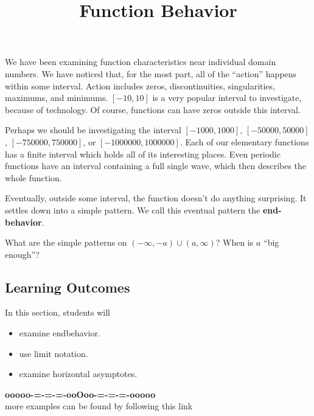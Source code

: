 \documentclass{ximera}
\title{Function Behavior}
\begin{document}
\begin{abstract}
\end{abstract}
\maketitle




We have been examining function characteristics near individual domain numbers. We have noticed that, for the most part, all of the ``action'' happens within some interval.  Action includes zeros, discontinuities, singularities, maximums, and minimums.  $[-10, 10]$  is a very popular interval to investigate, because of technology.  Of course, functions can have zeros outside this interval.  

Perhaps we should be investigating the interval $[-1000, 1000]$, $[-50000, 50000]$, $[-750000, 750000]$, or $[-1000000, 1000000]$. Each of our elementary functions has a finite interval which holds all of its interesting places.  Even periodic functions have an interval containing a full single wave, which then describes the whole function.

Eventually, outside some interval, the function doesn't do anything surprising.  It settles down into a simple pattern.  We call this eventual pattern the \textbf{\textcolor{purple!85!blue}{end-behavior}}.



What are the simple patterns on $(-\infty, -a) \cup (a, \infty)$?  When is $a$ ``big enough''?








\subsection*{Learning Outcomes}


\begin{sectionOutcomes}
In this section, students will 

\begin{itemize}
\item examine endbehavior.
\item use limit notation.
\item examine horizontal asymptotes.
\end{itemize}
\end{sectionOutcomes}










\begin{center}
\textbf{\textcolor{green!50!black}{ooooo-=-=-=-ooOoo-=-=-=-ooooo}} \\

more examples can be found by following this link\\ 

\end{center}
\end{document}
